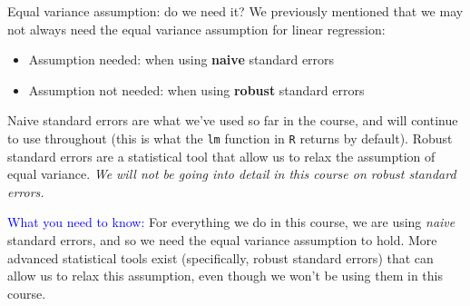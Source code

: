 \documentclass[10pt,t]{beamer}
\begin{document}
\begin{frame}{Equal variance assumption: do we need it?}
We previously mentioned that we may not always need the equal variance assumption for linear regression:

\vspace{0.3cm}

\begin{itemize}
	\item Assumption needed: when using \textbf{naive} standard errors 
	\item Assumption not needed: when using \textbf{robust} standard errors
\end{itemize}

\vspace{0.3cm}

Naive standard errors are what we've used so far in the course, and will continue to use throughout (this is what the \texttt{lm} function in \texttt{R} returns by default). Robust standard errors are a statistical tool that allow us to relax the assumption of equal variance. \textit{We will not be going into detail in this course on robust standard errors.}

\vspace{0.3cm}

\small \textcolor{blue}{What you need to know:} For everything we do in this course, we are using \textit{naive} standard errors, and so we need the equal variance assumption to hold. More advanced statistical tools exist (specifically, robust standard errors) that can allow us to relax this assumption, even though we won't be using them in this course.

\end{frame}
\end{document}
